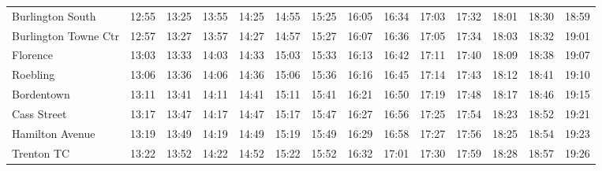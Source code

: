\begin{center}
\begin{tabular}{@{}lrrrrrrrrrrrrr@{}}
Burlington South & 12:55 & 13:25 & 13:55 & 14:25 & 14:55 & 15:25 & 16:05 & 16:34 & 17:03 & 17:32 & 18:01 & 18:30 & 18:59 \\
Burlington Towne Ctr & 12:57 & 13:27 & 13:57 & 14:27 & 14:57 & 15:27 & 16:07 & 16:36 & 17:05 & 17:34 & 18:03 & 18:32 & 19:01 \\
Florence & 13:03 & 13:33 & 14:03 & 14:33 & 15:03 & 15:33 & 16:13 & 16:42 & 17:11 & 17:40 & 18:09 & 18:38 & 19:07 \\
Roebling & 13:06 & 13:36 & 14:06 & 14:36 & 15:06 & 15:36 & 16:16 & 16:45 & 17:14 & 17:43 & 18:12 & 18:41 & 19:10 \\
Bordentown & 13:11 & 13:41 & 14:11 & 14:41 & 15:11 & 15:41 & 16:21 & 16:50 & 17:19 & 17:48 & 18:17 & 18:46 & 19:15 \\
Cass Street & 13:17 & 13:47 & 14:17 & 14:47 & 15:17 & 15:47 & 16:27 & 16:56 & 17:25 & 17:54 & 18:23 & 18:52 & 19:21 \\
Hamilton Avenue & 13:19 & 13:49 & 14:19 & 14:49 & 15:19 & 15:49 & 16:29 & 16:58 & 17:27 & 17:56 & 18:25 & 18:54 & 19:23 \\
Trenton TC & 13:22 & 13:52 & 14:22 & 14:52 & 15:22 & 15:52 & 16:32 & 17:01 & 17:30 & 17:59 & 18:28 & 18:57 & 19:26 \\
\bottomrule\end{tabular}\end{center}
